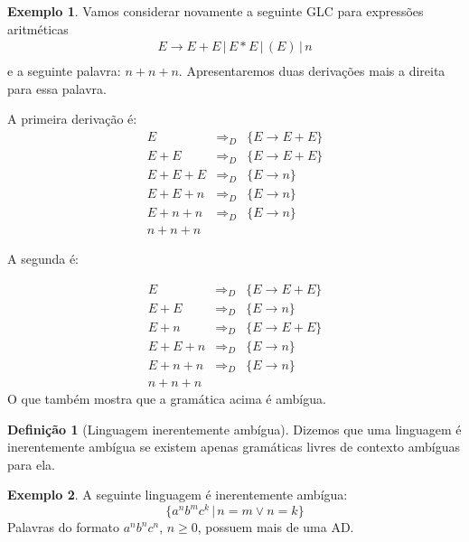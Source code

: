 \documentclass[a4paper]{article}
\theoremstyle{definition}
\newtheorem{Example}{Exemplo}
\newtheorem{Definition}{Definição}
\begin{document}
  \begin{Example}
    Vamos considerar novamente a seguinte GLC para expressões aritméticas
    \[
      \begin{array}{l}
        E \to E + E\,|\,E * E\,|\,(E)\,|\,n\\
      \end{array}
    \]
    e a seguinte palavra: $n + n + n$. Apresentaremos duas derivações mais a
    direita para essa palavra.

    A primeira derivação é:
    \[
      \begin{array}{lcl}
        E & \Rightarrow_D & \{E \to E + E\}\\
        E + E & \Rightarrow_D & \{E \to E + E\}\\
        E + E + E & \Rightarrow_D & \{E \to n\}\\
        E + E + n & \Rightarrow_D & \{E \to n\}\\
        E + n + n & \Rightarrow_D & \{E \to n\}\\
        n + n + n
      \end{array}
    \]

    A segunda é:

    \[
      \begin{array}{lcl}
        E & \Rightarrow_D & \{E \to E + E\} \\
        E + E & \Rightarrow_D & \{E \to n\} \\
        E + n & \Rightarrow_D & \{E \to E + E\}\\
        E + E + n & \Rightarrow_D & \{E \to n\} \\
        E + n + n & \Rightarrow_D & \{E \to n\} \\
        n + n + n
      \end{array}
    \]
    O que também mostra que a gramática acima é ambígua.
  \end{Example}

  \begin{Definition}[Linguagem inerentemente ambígua]
    Dizemos que uma linguagem é inerentemente ambígua se existem apenas
    gramáticas livres de contexto ambíguas para ela.
  \end{Definition}

  \begin{Example}
    A seguinte linguagem é inerentemente ambígua:
    \[
      \{a^nb^mc^k\,|\,n = m \lor n = k\}
    \]
    Palavras do formato $a^nb^nc^n$, $n \geq 0$, possuem mais de uma AD.
  \end{Example}
  
\end{document}
